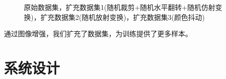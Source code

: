 \documentclass[UTF8,12pt]{article} %
\theoremstyle{definition}
\begin{document}
\begin{figure}[H]
	\centering
	\caption{原始数据集，扩充数据集1(随机裁剪+随机水平翻转+随机仿射变换)，扩充数据集2(随机放射变换)，扩充数据集3(颜色抖动)}
\end{figure}
通过图像增强，我们扩充了数据集，为训练提供了更多样本。
\section{系统设计}
\end{document}
